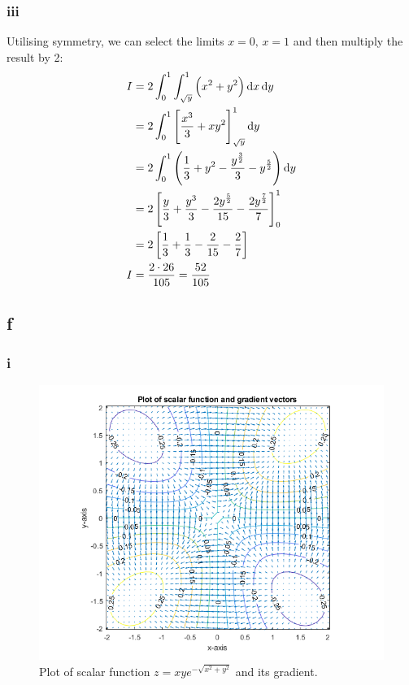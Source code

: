 \documentclass[11pt]{article}
\numberwithin{equation}{section}
\begin{document}
\subsubsection{iii}
Utilising symmetry, we can select the limits $x = 0, \, x=1$ and then multiply the result by 2:
\begin{align}
    I &= 2\int_0^1 \int_{\sqrt{y}}^1 \left(x^2 + y^2\right) \dif x \dif y\\
    &= 2\int_0^1 \left[\frac{x^3}{3} + xy^2\right]_{\sqrt{y}}^1 \dif y\\
    &= 2\int_0^1 \left(\frac{1}{3} + y^2 - \frac{y^{\frac{3}{2}}}{3} - y^{\frac{5}{2}}\right) \dif y\\
    &= 2\left[\frac{y}{3} + \frac{y^3}{3} - \frac{2y^{\frac{5}{2}}}{15} - \frac{2y^{\frac{7}{2}}}{7}\right]_0^1\\
    &= 2\left[\frac{1}{3} + \frac{1}{3} - \frac{2}{15} - \frac{2}{7}\right]\\
    I &= \frac{2\cdot 26}{105} = \frac{52}{105}
\end{align}
\subsection{f}
\subsubsection{i}
\begin{figure}[H]
    \centering
    \includegraphics[width = 0.75 \textwidth]{./img/q1fi.png}
    \caption{Plot of scalar function $z= xye^{-\sqrt{x^2 + y^2}}$ and its gradient.}
\end{figure}

\end{document}
